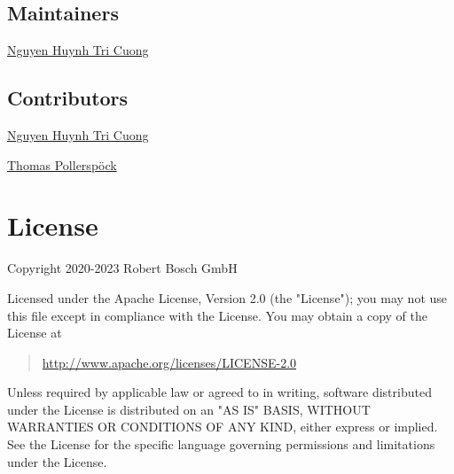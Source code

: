 \hypertarget{description-maintainers}{%
\subsection{Maintainers}\label{description-maintainers}}

\href{mailto:Cuong.NguyenHuynhTri@vn.bosch.com}{Nguyen Huynh Tri Cuong}

\hypertarget{description-contributors}{%
\subsection{Contributors}\label{description-contributors}}

\href{mailto:Cuong.NguyenHuynhTri@vn.bosch.com}{Nguyen Huynh Tri Cuong}

\href{mailto:Thomas.Pollerspoeck@de.bosch.com}{Thomas Pollerspöck}

\hypertarget{description-license}{%
\section{License}\label{description-license}}

Copyright 2020-2023 Robert Bosch GmbH

Licensed under the Apache License, Version 2.0 (the "License"); you may
not use this file except in compliance with the License. You may obtain
a copy of the License at

\begin{quote}
\url{http://www.apache.org/licenses/LICENSE-2.0}
\end{quote}

Unless required by applicable law or agreed to in writing, software
distributed under the License is distributed on an "AS IS" BASIS,
WITHOUT WARRANTIES OR CONDITIONS OF ANY KIND, either express or implied.
See the License for the specific language governing permissions and
limitations under the License.
